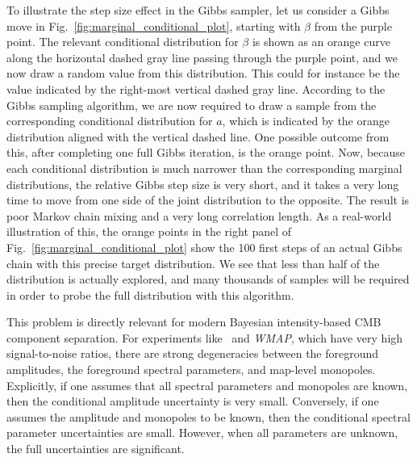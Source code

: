 \documentclass[twocolumn]{aa}
\def\WMAP{\emph{WMAP}}
\begin{document}
To illustrate the step size effect in the Gibbs sampler, let
us consider a Gibbs move in Fig.~\ref{fig:marginal_conditional_plot},
starting with $\beta$ from the purple point. The
relevant conditional distribution for $\beta$ is shown as an orange curve
along the horizontal dashed gray line passing through the purple
point, and we now draw a random value from this distribution. This
could for instance be the value indicated by the right-most vertical
dashed gray line. According to the Gibbs sampling algorithm, we are
now required to draw a sample from the corresponding conditional
distribution for $a$, which is indicated by the orange distribution
aligned with the vertical dashed line. One possible outcome from this,
after completing one full Gibbs iteration, is the orange point. Now,
because each conditional distribution is much narrower than the
corresponding marginal distributions, the relative Gibbs step size is
very short, and it takes a very long time to move from one side of the
joint distribution to the opposite. The result is poor Markov chain
mixing and a very long correlation length. As a real-world
illustration of this, the orange points in the right panel of
Fig.~\ref{fig:marginal_conditional_plot} show the 100 first steps of
an actual Gibbs chain with this precise target distribution. We see
that less than half of the distribution is actually explored, and many
thousands of samples will be required in order to probe the full
distribution with this algorithm.

This problem is directly relevant for modern Bayesian intensity-based
CMB component separation. For experiments like \Planck\ and \WMAP,
which have very high signal-to-noise ratios, there are strong
degeneracies between the foreground amplitudes, the foreground
spectral parameters, and map-level monopoles. Explicitly, if one
assumes that all spectral parameters and monopoles are known, then the
conditional amplitude uncertainty is very small. Conversely, if one
assumes the amplitude and monopoles to be known, then the conditional
spectral parameter uncertainties are small. However, when all
parameters are unknown, the full uncertainties are significant.
\end{document}
